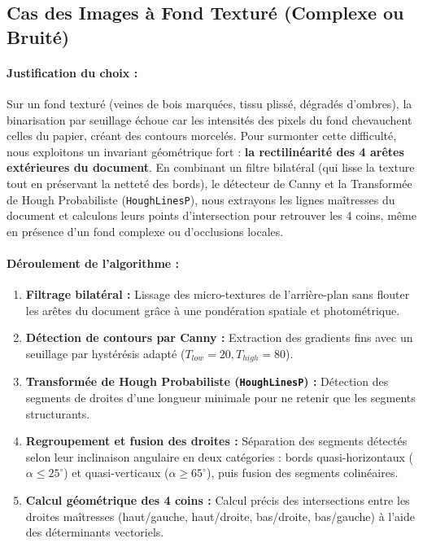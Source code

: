 \documentclass[a4paper,11pt]{article}
\begin{document}
\subsection{Cas des Images à Fond Texturé (Complexe ou Bruité)}

\paragraph{Justification du choix :}
Sur un fond texturé (veines de bois marquées, tissu plissé, dégradés d'ombres), la binarisation par seuillage échoue car les intensités des pixels du fond chevauchent celles du papier, créant des contours morcelés. Pour surmonter cette difficulté, nous exploitons un invariant géométrique fort : \textbf{la rectilinéarité des 4 arêtes extérieures du document}. En combinant un filtre bilatéral (qui lisse la texture tout en préservant la netteté des bords), le détecteur de Canny et la Transformée de Hough Probabiliste (\texttt{HoughLinesP}), nous extrayons les lignes maîtresses du document et calculons leurs points d'intersection pour retrouver les 4 coins, même en présence d'un fond complexe ou d'occlusions locales.

\paragraph{Déroulement de l'algorithme :}
\begin{enumerate}
    \item \textbf{Filtrage bilatéral :} Lissage des micro-textures de l'arrière-plan sans flouter les arêtes du document grâce à une pondération spatiale et photométrique.
    \item \textbf{Détection de contours par Canny :} Extraction des gradients fins avec un seuillage par hystérésis adapté ($T_{low}=20, T_{high}=80$).
    \item \textbf{Transformée de Hough Probabiliste (\texttt{HoughLinesP}) :} Détection des segments de droites d'une longueur minimale pour ne retenir que les segments structurants.
    \item \textbf{Regroupement et fusion des droites :} Séparation des segments détectés selon leur inclinaison angulaire en deux catégories : bords quasi-horizontaux ($\alpha \le 25^\circ$) et quasi-verticaux ($\alpha \ge 65^\circ$), puis fusion des segments colinéaires.
    \item \textbf{Calcul géométrique des 4 coins :} Calcul précis des intersections entre les droites maîtresses (haut/gauche, haut/droite, bas/droite, bas/gauche) à l'aide des déterminants vectoriels.
\end{enumerate}
\end{document}
